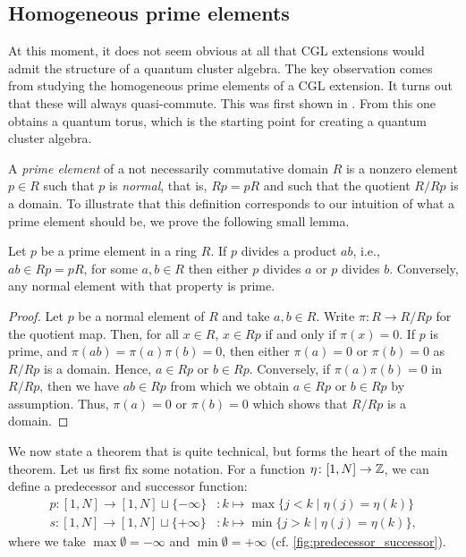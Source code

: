 \subsection{Homogeneous prime elements}

At this moment, it does not seem obvious at all that CGL extensions would admit the
structure of a quantum cluster algebra. The key observation comes from studying the
homogeneous prime elements of a CGL extension. It turns out that these will always
quasi-commute. This was first shown in \cite{GoodearlYakimov2016QuantumOre}. From this
one obtains a quantum torus, which is the starting point for creating a quantum cluster
algebra.

\medskip

A \emph{prime element} of a not necessarily commutative domain $R$
is a nonzero element $p \in R$ such that $p$ is \emph{normal},
that is, $Rp = pR$ and such that the quotient $R / Rp$ is a domain. To illustrate that
this definition corresponds to our intuition of what a prime element should be, we
prove the following small lemma.
\begin{lemma}\label{lem:prime_divides_product}
	Let $p$ be a prime element in a ring $R$. If $p$ divides a product $ab$, i.e., $ab \in
		Rp = pR$, for some $a,b \in R$ then either $p$ divides $a$ or $p$ divides $b$.
	Conversely, any normal element with that property is prime.
\end{lemma}
\begin{proof}
	Let $p$ be a normal element of $R$ and take $a,b \in R$. Write $\pi \colon R \to R /
		Rp$ for the quotient map. Then, for all $x \in R$, $x \in Rp$ if and only if $\pi(x) =
		0$. If $p$ is prime, and $\pi(ab) = \pi(a)\pi(b) = 0$, then either $\pi(a) = 0$ or
	$\pi(b) = 0$ as $R/Rp$ is a domain. Hence, $a \in Rp$ or $b \in Rp$. Conversely, if
	$\pi(a)\pi(b) = 0$ in $R/Rp$, then we have $ab \in Rp$ from which we obtain $a \in Rp$
	or $b \in Rp$ by assumption. Thus, $\pi(a) = 0$ or $\pi(b) = 0$ which shows that $R/
		Rp$ is a domain.
\end{proof}
%
We now state a theorem that is quite technical, but forms the heart of the main
theorem. Let us first fix some notation. For a function $\eta \colon [1, N] \to \mathbb{Z}$,
we can define a predecessor and successor
function:
\begin{align*}
	p \colon [1, N] \to [1, N] \sqcup \{-\infty\} & \colon k \mapsto  \max\{j < k \mid \eta(j) = \eta(k)\}  \\
	s \colon [1, N] \to [1, N] \sqcup \{+\infty\} & \colon k \mapsto  \min\{j > k \mid \eta(j) = \eta(k)\},
\end{align*}
%
where we take $\max \emptyset = - \infty$ and $\min \emptyset = + \infty$ (cf.
\cref{fig:predecessor_successor}).

